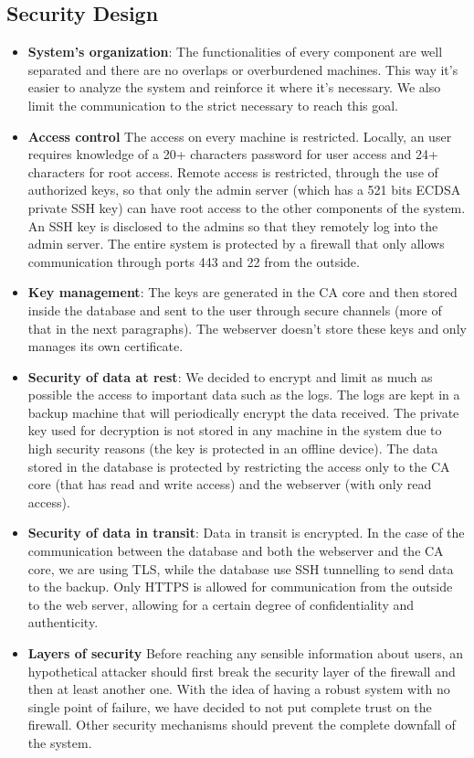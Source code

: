 \documentclass[english]{article}
\begin{document}
\subsection{Security Design}


\begin{itemize}
\item \textbf{System's organization}: The functionalities of every component are well separated and there are no overlaps or overburdened machines. This way it's easier to analyze the system and reinforce it where it's necessary. We also limit the communication to the strict necessary to reach this goal.
	\item \textbf{Access control} The access on every machine is restricted. Locally, an user requires knowledge of a 20+ characters password for user access and 24+ characters for root access. Remote access is restricted, through the use of authorized keys, so that only the admin server (which has a 521 bits ECDSA private SSH key) can have root access to the other components of the system. An SSH key is disclosed to the admins so that they remotely log into the admin server. The entire system is protected by a firewall that only allows communication through ports 443 and 22 from the outside.
	\item \textbf{Key management}: The keys are generated in the CA core and then stored inside the database and sent to the user through secure channels (more of that in the next paragraphs). The webserver doesn't store these keys and only manages its own certificate.
	\item \textbf{Security of data at rest}: We decided to encrypt and limit as much as possible the access to important data such as  the logs. The logs are kept in a backup machine that will periodically encrypt the data received. The private key used for decryption is not stored in any machine in the system due to high security reasons (the key is protected in an offline device). The data stored in the database is protected by restricting the access only to the CA core (that has read and write access) and the webserver (with only read access).
	\item \textbf{Security of data in transit}: Data in transit is encrypted. In the case of the communication between the database and both the webserver and the CA core, we are using TLS, while the database  use SSH tunnelling to send data to the backup. Only HTTPS is allowed for communication from the outside to the web server, allowing for a certain degree of confidentiality and authenticity.
\item \textbf{Layers of security} Before reaching any sensible information about users, an hypothetical attacker should first break the security layer of the firewall and then at least another one. With the idea of having a robust system with no single point of failure, we have decided to not put complete trust on the firewall. Other security mechanisms should prevent the complete downfall of the system.

\end{itemize}
\end{document}
